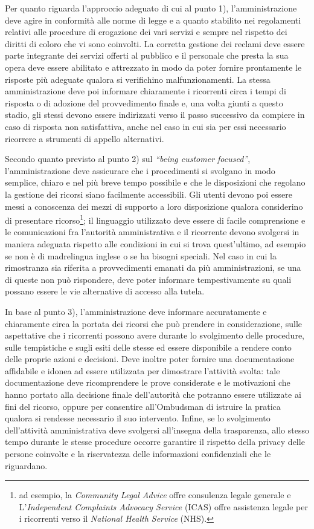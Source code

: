 \documentclass[12pt,it,a4paper,]{report}
\begin{document}
Per quanto riguarda l'approccio adeguato di cui al punto 1),
l'amministrazione deve agire in conformità alle norme di legge e a
quanto stabilito nei regolamenti relativi alle procedure di erogazione
dei vari servizi e sempre nel rispetto dei diritti di coloro che vi sono
coinvolti. La corretta gestione dei reclami deve essere parte integrante
dei servizi offerti al pubblico e il personale che presta la sua opera
deve essere abilitato e attrezzato in modo da poter fornire prontamente
le risposte più adeguate qualora si verifichino malfunzionamenti. La
stessa amministrazione deve poi informare chiaramente i ricorrenti circa
i tempi di risposta o di adozione del provvedimento finale e, una volta
giunti a questo stadio, gli stessi devono essere indirizzati verso il
passo successivo da compiere in caso di risposta non satisfattiva, anche
nel caso in cui sia per essi necessario ricorrere a strumenti di appello
alternativi.

Secondo quanto previsto al punto 2) sul \emph{``being customer
focused''}, l'amministrazione deve assicurare che i procedimenti si
svolgano in modo semplice, chiaro e nel più breve tempo possibile e che
le disposizioni che regolano la gestione dei ricorsi siano facilmente
accessibili. Gli utenti devono poi essere messi a conoscenza dei mezzi
di supporto a loro disposizione qualora considerino di presentare
ricorso\footnote{ad esempio, la \emph{Community Legal Advice} offre
  consulenza legale generale e L'\emph{Independent Complaints Advocacy
  Service} (ICAS) offre assistenza legale per i ricorrenti verso il
  \emph{National Health Service} (NHS).}; il linguaggio utilizzato deve
essere di facile comprensione e le comunicazioni fra l'autorità
amministrativa e il ricorrente devono svolgersi in maniera adeguata
rispetto alle condizioni in cui si trova quest'ultimo, ad esempio se non
è di madrelingua inglese o se ha bisogni speciali. Nel caso in cui la
rimostranza sia riferita a provvedimenti emanati da più amministrazioni,
se una di queste non può rispondere, deve poter informare
tempestivamente su quali possano essere le vie alternative di accesso
alla tutela.

In base al punto 3), l'amministrazione deve informare accuratamente e
chiaramente circa la portata dei ricorsi che può prendere in
considerazione, sulle aspettative che i ricorrenti possono avere durante
lo svolgimento delle procedure, sulle tempistiche e sugli esiti delle
stesse ed essere disponibile a rendere conto delle proprie azioni e
decisioni. Deve inoltre poter fornire una documentazione affidabile e
idonea ad essere utilizzata per dimostrare l'attività svolta: tale
documentazione deve ricomprendere le prove considerate e le motivazioni
che hanno portato alla decisione finale dell'autorità che potranno
essere utilizzate ai fini del ricorso, oppure per consentire
all'Ombudsman di istruire la pratica qualora si rendesse necessario il
suo intervento. Infine, se lo svolgimento dell'attività amministrativa
deve svolgersi all'insegna della trasparenza, allo stesso tempo durante
le stesse procedure occorre garantire il rispetto della privacy delle
persone coinvolte e la riservatezza delle informazioni confidenziali che
le riguardano.
\end{document}
